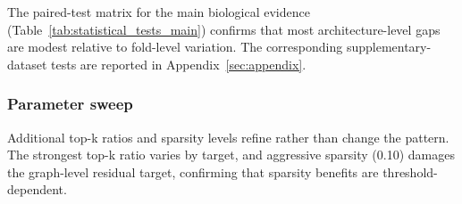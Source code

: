 

The paired-test matrix for the main biological evidence (Table~\ref{tab:statistical_tests_main}) confirms that most architecture-level gaps are modest relative to fold-level variation. The corresponding supplementary-dataset tests are reported in Appendix~\ref{sec:appendix}.

\subsubsection{Parameter sweep}

Additional top-k ratios and sparsity levels refine rather than change the pattern. The strongest top-k ratio varies by target, and aggressive sparsity (0.10) damages the graph-level residual target, confirming that sparsity benefits are threshold-dependent.
